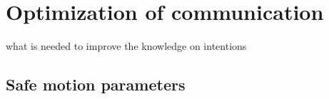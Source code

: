 \chapter{Optimization of communication}
what is needed to improve the knowledge on intentions

\section{Safe motion parameters}